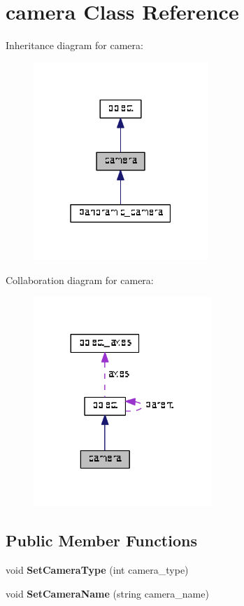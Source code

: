 \hypertarget{classcamera}{}\section{camera Class Reference}
\label{classcamera}


Inheritance diagram for camera\+:\nopagebreak
\begin{figure}[H]
\begin{center}
\leavevmode
\includegraphics[width=187pt]{classcamera__inherit__graph}
\end{center}
\end{figure}


Collaboration diagram for camera\+:\nopagebreak
\begin{figure}[H]
\begin{center}
\leavevmode
\includegraphics[width=191pt]{classcamera__coll__graph}
\end{center}
\end{figure}
\subsection*{Public Member Functions}
\begin{DoxyCompactItemize}
\item 
\mbox{\label{classcamera_afecbb7cc19e96f75ce586aa1e11cac5a}} 
void {\bfseries Set\+Camera\+Type} (int camera\+\_\+type)
\item 
\mbox{\label{classcamera_a47c54b248b72d28ab8bad6469c03d25c}} 
void {\bfseries Set\+Camera\+Name} (string camera\+\_\+name)
\end{DoxyCompactItemize}
